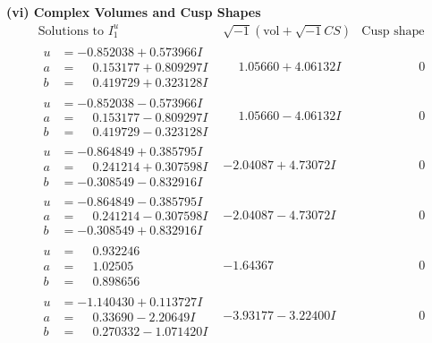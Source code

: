 \documentclass[1p]{elsarticle_modified}
\theoremstyle{definition}
\newcommand{\I}{\sqrt{-1}}
\begin{document}
\newpage\flushleft \textbf{(vi) Complex Volumes and Cusp Shapes}
$$\begin{array}{c|c|c}  
\text{Solutions to }I^u_{1}& \I (\text{vol} + \sqrt{-1}CS) & \text{Cusp shape}\\
 \hline 
\begin{aligned}
u &= -0.852038 + 0.573966 I \\
a &= \phantom{-}0.153177 + 0.809297 I \\
b &= \phantom{-}0.419729 + 0.323128 I\end{aligned}
 & \phantom{-}1.05660 + 4.06132 I & \phantom{-0.000000 } 0 \\ \hline\begin{aligned}
u &= -0.852038 - 0.573966 I \\
a &= \phantom{-}0.153177 - 0.809297 I \\
b &= \phantom{-}0.419729 - 0.323128 I\end{aligned}
 & \phantom{-}1.05660 - 4.06132 I & \phantom{-0.000000 } 0 \\ \hline\begin{aligned}
u &= -0.864849 + 0.385795 I \\
a &= \phantom{-}0.241214 + 0.307598 I \\
b &= -0.308549 - 0.832916 I\end{aligned}
 & -2.04087 + 4.73072 I & \phantom{-0.000000 } 0 \\ \hline\begin{aligned}
u &= -0.864849 - 0.385795 I \\
a &= \phantom{-}0.241214 - 0.307598 I \\
b &= -0.308549 + 0.832916 I\end{aligned}
 & -2.04087 - 4.73072 I & \phantom{-0.000000 } 0 \\ \hline\begin{aligned}
u &= \phantom{-}0.932246\phantom{ +0.000000I} \\
a &= \phantom{-}1.02505\phantom{ +0.000000I} \\
b &= \phantom{-}0.898656\phantom{ +0.000000I}\end{aligned}
 & -1.64367\phantom{ +0.000000I} & \phantom{-0.000000 } 0 \\ \hline\begin{aligned}
u &= -1.140430 + 0.113727 I \\
a &= \phantom{-}0.33690 - 2.20649 I \\
b &= \phantom{-}0.270332 - 1.071420 I\end{aligned}
 & -3.93177 - 3.22400 I & \phantom{-0.000000 } 0 \\ \hline\begin{aligned}

\end{aligned}
\end{array}$$
\end{document}
